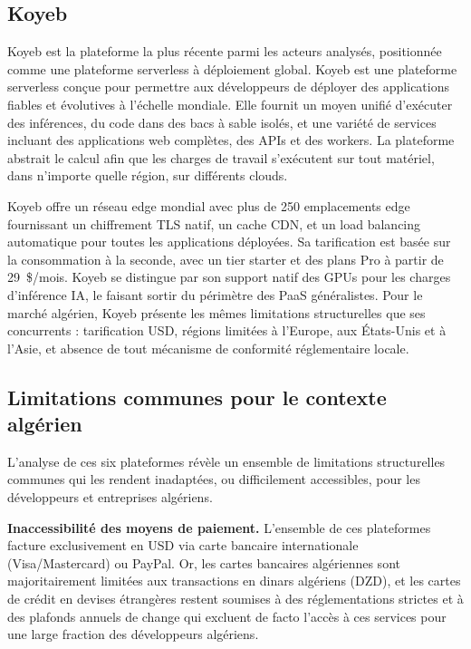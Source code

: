 \subsection*{Koyeb}

Koyeb est la plateforme la plus récente parmi les acteurs analysés, positionnée comme une plateforme serverless à déploiement global. Koyeb est une plateforme serverless conçue pour permettre aux développeurs de déployer des applications fiables et évolutives à l'échelle mondiale. Elle fournit un moyen unifié d'exécuter des inférences, du code dans des bacs à sable isolés, et une variété de services incluant des applications web complètes, des APIs et des workers. La plateforme abstrait le calcul afin que les charges de travail s'exécutent sur tout matériel, dans n'importe quelle région, sur différents clouds. 

Koyeb offre un réseau edge mondial avec plus de 250 emplacements edge fournissant un chiffrement TLS natif, un cache CDN, et un load balancing automatique pour toutes les applications déployées.  Sa tarification est basée sur la consommation à la seconde, avec un tier starter et des plans Pro à partir de 29~\$/mois. Koyeb se distingue par son support natif des GPUs pour les charges d'inférence IA, le faisant sortir du périmètre des PaaS généralistes. Pour le marché algérien, Koyeb présente les mêmes limitations structurelles que ses concurrents : tarification USD, régions limitées à l'Europe, aux États-Unis et à l'Asie, et absence de tout mécanisme de conformité réglementaire locale.

\subsection*{Limitations communes pour le contexte algérien}

L'analyse de ces six plateformes révèle un ensemble de limitations structurelles communes qui les rendent inadaptées, ou difficilement accessibles, pour les développeurs et entreprises algériens.

\textbf{Inaccessibilité des moyens de paiement.} L'ensemble de ces plateformes facture exclusivement en USD via carte bancaire internationale (Visa/Mastercard) ou PayPal. Or, les cartes bancaires algériennes sont majoritairement limitées aux transactions en dinars algériens (DZD), et les cartes de crédit en devises étrangères restent soumises à des réglementations strictes et à des plafonds annuels de change qui excluent de facto l'accès à ces services pour une large fraction des développeurs algériens.

